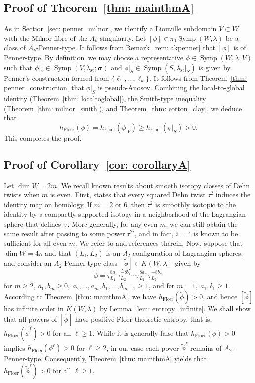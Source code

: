 \documentclass[12pt]{article}
\renewcommand{\ge}{\geqslant}
\renewcommand{\geq}{\geqslant}
\theoremstyle{theorem}
\theoremstyle{definition}
\theoremstyle{remark}
\numberwithin{equation}{section}
\DeclareMathOperator{\floer}{Floer}
\DeclareMathOperator{\Symp}{Symp}
\DeclareMathOperator{\st}{st}
\begin{document}
\subsection{Proof of Theorem~\ref{thm: mainthmA}}
As in Section~\ref{sec: penner_milnor}, we identify a Liouville subdomain $V\subset W$ with the Milnor fibre of the $A_k$-singularity.
Let $[\phi]\in \pi_0\Symp(W,\lambda)$ be a class of $A_k$-Penner-type.
It follows from Remark~\ref{rem: akpenner} that $[\phi]$ is of Penner-type.
By definition, we may choose a representative $\phi\in \Symp(W,\lambda;V)$ such that $\phi|_V\in \Symp(V,\lambda_{\st};{\bm \sigma})$ and $\phi|_S\in\Symp(S,\lambda_{\st}|_S)$ is given by Penner's construction formed from $\{\ell_1,\dots,\ell_k\}$.
It follows from Theorem~\ref{thm: penner_construction} that $\phi|_S$ is pseudo-Anosov.
Combining the local-to-global identity (Theorem~\ref{thm: localtoglobal}), the Smith-type inequality (Theorem~\ref{thm: milnor_smith}), and Theorem~\ref{thm: cotton_clay}, we deduce that
$$
h_{\floer}(\phi) = h_{\floer}(\phi|_V) \ge h_{\floer}(\phi|_S) > 0.
$$
This completes the proof.
\subsection{Proof of Corollary~\ref{cor: corollaryA}}\label{sec: corollaryA}
Let $\dim W=2m$.
We recall known results about smooth isotopy classes of Dehn twists when $m$ is even.
First, \cite[Lemma~3.12]{To15} states that every squared Dehn twist $\tau^2$ induces the identity map on homology.
If $m=2$ or $6$, then $\tau^2$ is smoothly isotopic to the identity by a compactly supported isotopy in a neighborhood of the Lagrangian sphere that defines~$\tau$.
More generally, for any even $m$, we can still obtain the same result after passing to some power $\tau^{2i}$, and in fact, $i=4$ is known to be sufficient for all even $m$.
We refer to \cite[Section~5]{Se14_1} and references therein.
Now, suppose that $\dim W=4n$ and that $(L_1,L_2)$ is an $A_2$-configuration of Lagrangian spheres, and consider an $A_2$-Penner-type class $[\tilde{\phi}]\in K(W,\lambda)$ given by
$$
\tilde{\phi}=\tau_{L_1}^{8a_1}\tau_{L_2}^{-8b_1}\cdots\tau_{L_1}^{8a_m}\tau_{L_2}^{-8b_m}%
$$
for $m\ge2,\ a_1,b_m\ge0,\ a_2,\dots,a_m,b_1,\dots,b_{m-1}\ge1$, and for $m=1,\ a_1,b_1\geq 1$.
According to Theorem~\ref{thm: mainthmA}, we have $h_{\floer}(\tilde{\phi})>0$, and hence $[\tilde{\phi}]$ has infinite order in $K(W,\lambda)$ by Lemma~\ref{lem: entropy_infinite}.
We shall show that all powers of $[\tilde{\phi}]$ have positive Floer-theoretic entropy, that is, $h_{\floer}(\tilde{\phi}^\ell)>0$ for all $\ell\ge 1$.
While it is generally false that $h_{\floer}(\phi)>0$ implies $h_{\floer}(\phi^\ell)>0$ for $\ell\ge 2$, in our case each power $\tilde{\phi}^\ell$ remains of $A_2$-Penner-type.
Consequently, Theorem~\ref{thm: mainthmA} yields that $h_{\floer}(\tilde{\phi}^\ell)>0$ for all $\ell\ge 1$.
\end{document}
